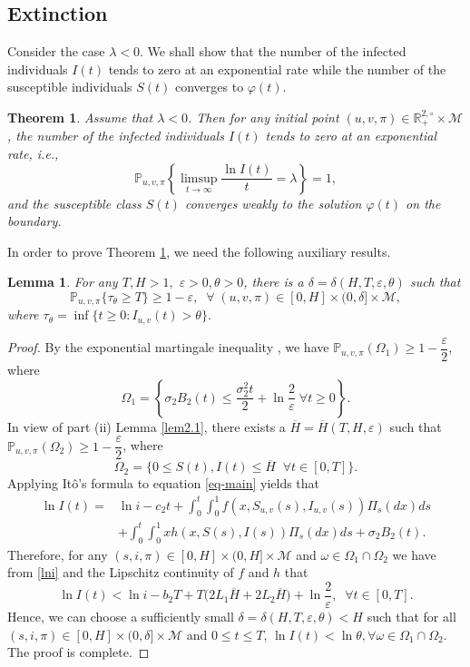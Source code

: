 \documentclass[12pt]{amsart}
\newtheorem{thm}{Theorem}[section]
\newtheorem{lm}{Lemma}[section]
\theoremstyle{remark}
\numberwithin{equation}{section}
\newcommand{\eps}{\varepsilon}
\newcommand{\M}{\mathcal{M}}
\newcommand{\PP}{\mathbb{P}}
\newcommand{\abs}[1]{\left\vert#1\right\vert}
\numberwithin{equation}{section}
\newcommand{\PPi}{\PP_{u,v,\pi}}
\newcommand{\1}{\boldsymbol{1}}
\def\bar{\overline}
\def\a.s{\text{\;a.s.\;}}
\begin{document}
\subsection{Extinction}\label{secext}
Consider the case
$\lambda<0$.
We shall show that the number of the infected individuals $I(t)$ tends to zero at an exponential rate while the number of the susceptible individuals $S(t)$ converges to $\varphi(t)$.

\begin{thm}\label{R<1}
Assume that $\lambda<0$. Then for any initial point $(u,v,\pi)\in\mathbb{R}_+^{2,\circ}\times\M$,
the number of the infected individuals $I(t)$ tends to zero  at an exponential rate, i.e., %
$$\PPi\left\{\limsup\limits_{t\to\infty}\dfrac{\ln I(t)}{t}= \lambda\right\}=1,$$
and the susceptible class $S(t)$ converges weakly to the solution $\varphi(t)$ on the boundary.
\end{thm}

In order to prove Theorem \ref{R<1}, we need the following auxiliary results.

\begin{lm}\label{lem2.2}
For any $T,H>1,$ $\eps >0, \theta >0$, there is a $\delta =\delta (H,T,\eps,\theta)$ such that
$$\PPi\{ \tau_{\theta} \geq T \}\geq 1-\eps,\;\;\forall \; (u,v,\pi) \in [0,H]\times (0,\delta]\times\M,$$
where $\tau_{\theta}=\inf\{t\geq 0: I_{u,v}(t)> \theta \}.$
\end{lm}

\begin{proof}
By the exponential martingale inequality \cite[Theorem 7.4, p. 44]{MAO}, we have $\PPi(\Omega_1)\geq 1-\dfrac{\eps}{2}$, where
$$\Omega_1=\left\{ \sigma_2 B_2(t)\leq \dfrac{\sigma_2^2t}{2}+\ln \dfrac{2}{\eps}\;\forall t\geq 0\right\}.$$
In view of part (ii) Lemma \ref{lem2.1}, there exists a $\bar H=\bar H(T,H,\eps)$ such that $\PPi(\Omega_2)\geq 1-\dfrac{\eps}{2}$, where
$$\Omega_2=\{ 0 \leq S(t),I(t) \leq \bar H \;\;\forall t \in [0,T] \}.$$
Applying  It\^{o}'s formula to equation \eqref{eq-main} yields
that
\begin{equation}\label{lni}
\begin{aligned}
\ln I(t)=&\ln i -c_2t+\int_0^t\int_0^1f(x,S_{u,v}(s),I_{u,v}(s))\Pi_s(dx)ds\\  &+\int_0^t\int_0^1xh(x,S(s),I(s))\Pi_s(dx)ds
+\sigma_2B_2(t).
\end{aligned}
 \end{equation}
Therefore, for any $(s,i,\pi) \in [0,H]\times (0,H]\times\M$ and $\omega \in \Omega_1 \cap \Omega_2$ we have from \eqref{lni} and the Lipschitz continuity of $f$ and $h$ that
$$\ln I(t) < \ln i - b_2T+T\big(2L_1\bar H+2L_2\bar H\big) + \ln \dfrac{2}{\eps},\;\;\forall t\in [0,T]. $$
Hence, we can choose a sufficiently small $\delta =\delta (H,T,\eps,\theta)<H$  such that for all $(s,i,\pi)\in [0,H]\times (0,\delta]\times\M$ and $0\leq t\leq T$, $\ln I(t)<\ln\theta,\forall\omega\in\Omega_1\cap\Omega_2$. The proof is complete.
\end{proof}
\end{document}
